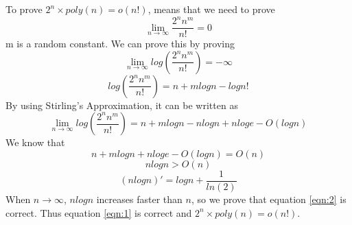 \begin{solution}
    To prove $2^n \times poly(n)=o(n!)$, means that we need to prove
    \begin{equation}
        \label{eqn:1}
        \lim_{n \to \infty} \frac{2^nn^m}{n!} = 0
    \end{equation}
    m is a random constant. We can prove this by proving
    \begin{equation}
        \label{eqn:2}
        \lim_{n \to \infty} log(\frac{2^nn^m}{n!}) = -\infty
    \end{equation}
    $$log(\frac{2^nn^m}{n!}) = n + mlogn - logn!$$
    By using Stirling's Approximation, it can be written as
    $$\lim_{n \to \infty} log(\frac{2^nn^m}{n!}) = n + mlogn - nlogn + nloge - O(logn)$$
    We know that
    $$n + mlogn + nloge - O(logn) = O(n)$$
    $$nlogn > O(n)$$
    $$(nlogn)' = logn + \frac{1}{ln(2)}$$
    When $n \to \infty$, $nlogn$ increases faster than $n$, 
    so we prove that equation \ref{eqn:2} is correct. Thus equation \ref{eqn:1} is correct and $2^n \times poly(n)=o(n!)$.

\end{solution}